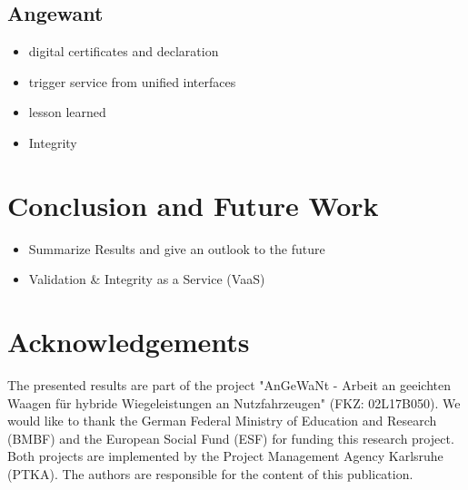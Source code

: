 \documentclass[3p,times,procedia]{elsarticle}
\begin{document}
\subsection{Angewant}
\begin{itemize}
    \item digital certificates and declaration %
    \item trigger service from unified interfaces %
    \item lesson learned %
    \item Integrity %
\end{itemize}


\section{Conclusion and Future Work}
\begin{itemize}
    \item Summarize Results and give an outlook to the future 
    \item Validation \& Integrity as a Service (VaaS)
\end{itemize}

\section*{Acknowledgements}

The presented results are part of the project "AnGeWaNt - Arbeit an geeichten Waagen für hybride Wiegeleistungen an Nutzfahrzeugen" (FKZ: 02L17B050). We would like to thank the German Federal Ministry of Education and Research (BMBF) and the European Social Fund (ESF) for funding this research project. Both projects are implemented by the Project Management Agency Karlsruhe (PTKA). The authors are responsible for the content of this publication.

\end{document}
